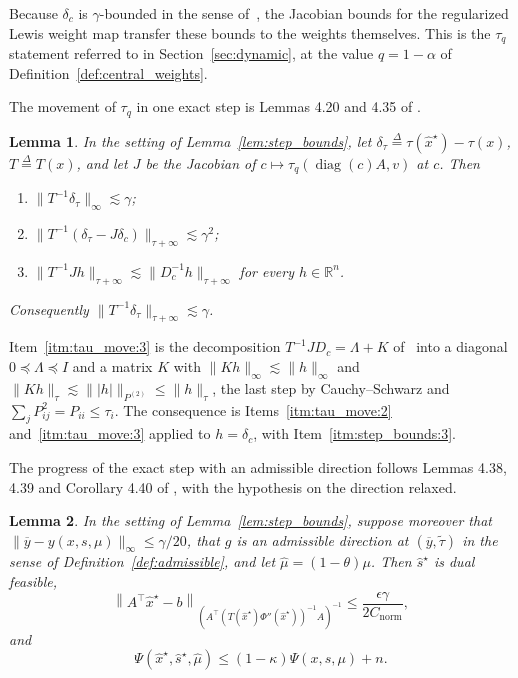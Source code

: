 \documentclass[11pt]{article}
\newtheorem{lemma}{Lemma}[section]
\newcommand{\R}{\mathbb R}
\newcommand{\diag}{\operatorname{diag}}
\newcommand{\xhat}{\widehat{x}}
\newcommand{\shat}{\widehat{s}}
\newcommand{\muhat}{\widehat{\mu}}
\newcommand{\tautil}{\widetilde{\tau}}
\newcommand{\defeq}{\stackrel{\Delta}{=}}
\newcommand{\Cnorm}{C_{\mathrm{norm}}}
\begin{document}
Because $\delta_c$ is
$\gamma$-bounded in the sense of~\cite[Definition
4.23]{BLLSSSW21}, the Jacobian bounds for the
regularized Lewis weight map transfer these bounds to the weights themselves.
This is the $\tau_q$ statement referred to in Section~\ref{sec:dynamic}, at the
value $q = 1 - \alpha$ of Definition~\ref{def:central_weights}.

The movement of $\tau_q$ in one exact step is Lemmas 4.20 and 4.35 of
\cite{BLLSSSW21}.

\begin{lemma}
\label{lem:tau_move}
In the setting of Lemma~\ref{lem:step_bounds}, let
$\delta_\tau \defeq \tau(\xhat^{\star}) - \tau(x)$,
$T \defeq T(x)$, and let
$J$ be the Jacobian of
$c \mapsto \tau_{q}(\diag(c) A, v)$ at
$c$.
Then
\begin{enumerate}
\item \label{itm:tau_move:1} $\|T^{-1} \delta_\tau\|_{\infty} \lesssim \gamma$;
\item \label{itm:tau_move:2}
  $\|T^{-1} (\delta_\tau - J \delta_c)\|_{\tau + \infty} \lesssim \gamma^2$;
\item \label{itm:tau_move:3}
  $\|T^{-1} J h\|_{\tau + \infty} \lesssim \|D_c^{-1} h\|_{\tau + \infty}$ for
  every $h \in \R^{n}$.
\end{enumerate}
Consequently $\|T^{-1} \delta_\tau\|_{\tau + \infty} \lesssim \gamma$.
\end{lemma}

Item~\ref{itm:tau_move:3} is the decomposition $T^{-1} J D_c = \Lambda + K$
of~\cite[Lemma 4.20]{BLLSSSW21} into a
diagonal $0 \preceq \Lambda \preceq I$ and a matrix
$K$ with
$\|K h\|_{\infty} \lesssim \|h\|_{\infty}$ and
$\|K h\|_{\tau} \lesssim \||h|\|_{P^{(2)}} \le \|h\|_{\tau}$, the last step by
Cauchy--Schwarz and $\sum_j P_{ij}^{2} = P_{ii} \le \tau_i$.
The consequence is Items~\ref{itm:tau_move:2} and~\ref{itm:tau_move:3} applied
to $h = \delta_c$, with Item~\ref{itm:step_bounds:3}.

The progress of the exact step with an admissible direction follows Lemmas 4.38,
4.39 and Corollary 4.40 of \cite{BLLSSSW21},
with the hypothesis on the direction relaxed.

\begin{lemma}
\label{lem:progress}
In the setting of Lemma~\ref{lem:step_bounds}, suppose moreover that
$\|\overline{y} - y(x, s, \mu)\|_{\infty} \le \gamma / 20$, that
$g$ is an admissible direction at
$(\overline{y}, \tautil)$ in the sense of Definition~\ref{def:admissible}, and
let $\muhat = (1 - \theta) \mu$.
Then $\shat^{\star}$ is dual feasible,
\[
\left\| A^\top \xhat^{\star} - b
\right\|_{(A^\top (T(\xhat^{\star}) \Phi''(\xhat^{\star}))^{-1} A)^{-1}}
\le
\frac{\epsilon \gamma}{2 \Cnorm},
\]
and
\[
\Psi(\xhat^{\star}, \shat^{\star}, \muhat)
\le
\left( 1 - \kappa \right) \Psi(x, s, \mu) + n .
\]
\end{lemma}
\end{document}
